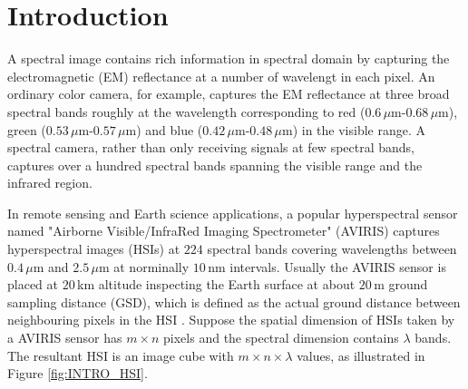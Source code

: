 \chapter{Introduction}

A spectral image contains rich information in spectral domain by capturing the
electromagnetic (EM) reflectance at a number of wavelengt in each pixel.
An ordinary color camera, for example, captures the EM reflectance at three
broad spectral bands roughly at the wavelength corresponding to red
($0.6\,\mu$m-$0.68\,\mu$m), green ($0.53\,\mu$m-$0.57\,\mu$m) and blue
($0.42\,\mu$m-$0.48\,\mu$m) in the visible range.
A spectral camera, rather than only receiving signals at few spectral bands,
captures over a hundred spectral bands spanning the visible range and the
infrared region.

In remote sensing and Earth science applications, a popular hyperspectral
sensor named "Airborne Visible/InfraRed Imaging Spectrometer" (AVIRIS)
captures hyperspectral images (HSIs) at $224$ spectral bands covering
wavelengths between $0.4\,\mu$m and $2.5\,\mu$m at norminally $10\,$nm
intervals.
Usually the AVIRIS sensor is placed at $20\,$km altitude inspecting the Earth
surface at about $20\,$m ground sampling distance (GSD), which is defined as
the actual ground distance between neighbouring pixels in the HSI
\cite{COMP_AVIRIS_HYPERION_FOR_HSI_MINERAL_MAPPING,
      IMG_SPECTROSCOPY_AND_AVIRIS,
      EXPL_RELATION_BTW_INFO_AND_SNR_AND_SPATIAL_RESOL_IN_AVIRIS}.
Suppose the spatial dimension of HSIs taken by a AVIRIS sensor has $m \times n$
pixels and the spectral dimension contains $\lambda$ bands.
The resultant HSI is an image cube with $m \times n \times \lambda$ values, as
illustrated in Figure \ref{fig:INTRO_HSI}.

